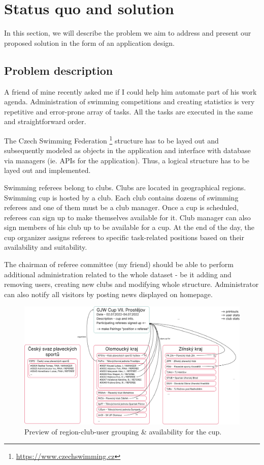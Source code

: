 \chapter{Status quo and solution}
In this section, we will describe the problem we aim to address and present our proposed solution in the form of an application design.
\section{Problem description}
\par
A friend of mine recently asked me if I could help him automate part of his work agenda. Administration of swimming competitions and creating statistics is very repetitive and error-prone array of tasks. All the tasks are executed in the same and straightforward order. \par
The Czech Swimming Federation \footnote{\url{https://www.czechswimming.cz}} structure has to be layed out and subsequently modeled as objects in the application and interface with database via managers (ie. APIs for the application). Thus, a logical structure has to be layed out and implemented. \par
Swimming referees belong to clubs. Clubs are located in geographical regions. Swimming cup is hosted by a club. Each club contains dozens of swimming referees and one of them must be a club manager. Once a cup is scheduled, referees can sign up to make themselves available for it. Club manager can also sign members of his club up to be available for a cup. At the end of the day, the cup organizer assigns referees to specific task-related positions based on their availability and suitability. \par
The chairman of referee committee (my friend) should be able to perform additional administration related to the whole dataset - be it adding and removing users, creating new clubs and modifying whole structure. Administrator can also notify all visitors by posting news displayed on homepage. \par
\begin{figure}[h]
  \centering	
  \includegraphics[scale=0.265]{img/swimmpair_schema.png}
  \caption{Preview of region-club-user grouping \& availability for the cup.}
  \label{fig1.1:grouping}
\end{figure}
